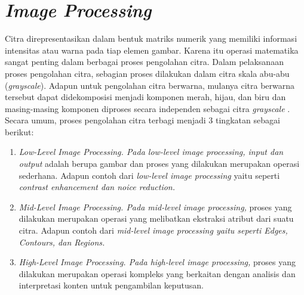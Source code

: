 \section{\textit{Image Processing}}
\label{sec:imageprocessing}
Citra direpresentasikan dalam bentuk matriks numerik yang memiliki informasi intensitas atau warna pada tiap elemen gambar. Karena itu operasi matematika sangat penting dalam berbagai proses pengolahan citra. Dalam pelaksanaan proses pengolahan citra, sebagian proses dilakukan dalam citra skala abu-abu (\textit{grayscale}). Adapun untuk pengolahan citra berwarna, mulanya citra berwarna tersebut dapat didekomposisi menjadi komponen merah, hijau, dan biru dan masing-masing komponen diproses secara independen sebagai citra \textit{grayscale} \citep*{tyagi2018understanding}. Secara umum, proses pengolahan citra terbagi menjadi 3 tingkatan sebagai berikut:
\begin{enumerate}
    \item \textit{Low-Level Image Processing. \textnormal{Pada} low-level image processing, input \textnormal{dan} output} adalah berupa gambar dan proses yang dilakukan merupakan operasi sederhana. Adapun contoh dari \textit{low-level image processing} yaitu seperti \textit{contrast enhancement \textnormal{dan} noice reduction.}  
    \item \textit{Mid-Level Image Processing. \textnormal{Pada} mid-level image processing,} proses yang dilakukan merupakan operasi yang melibatkan ekstraksi atribut dari suatu citra. Adapun contoh dari \textit{mid-level image processing \textnormal{yaitu seperti} Edges, Contours, \textnormal{dan} Regions.}
    \item \textit{High-Level Image Processing. \textnormal{Pada} high-level image processing,} proses yang dilakukan merupakan operasi kompleks yang berkaitan dengan analisis dan interpretasi konten untuk pengambilan keputusan.
\end{enumerate} 

